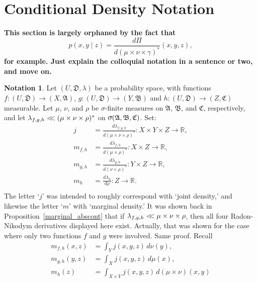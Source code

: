 \documentclass[
twoside=true,
paper=letter,
fontsize=9pt,
pagesize=auto,
leqno,
openany,
headsepline,
overfullrule,
]{scrbook}
\theoremstyle{plain}
\theoremstyle{plain}
\theoremstyle{definition}
\newtheorem{notn}[thm]{Notation}
\theoremstyle{bfnoteitalic}
\theoremstyle{bfnoteroman}
\newcommand{\sigalg}[1]{\mathfrak{#1}}
\newcommand{\textsigma}{\hbox{\large{$\sigma$}}\kern-1pt}
\newcommand{\R}{\mathbb{R}}
\newcommand{\sigmaalgebra}{\sigalg{A}}
\newcommand{\sigmaalgebraii}{\sigalg{B}}
\newcommand{\sigmaalgebraiii}{\sigalg{C}}
\newcommand{\funcf}{f}
\newcommand{\funcg}{g}
\newcommand{\funch}{h}
\newcommand{\funcj}{j}
\newcommand{\function}{f}
\newcommand{\functionii}{g}
\newcommand{\functioniii}{h}
\newcommand{\measurespace}{X}
\newcommand{\measurespaceii}{Y}
\newcommand{\measurespaceiii}{Z}
\newcommand{\mspaceelt}{x}
\newcommand{\mspaceeltii}{y}
\newcommand{\mspaceeltiii}{z}
\newcommand{\abscont}{\mathrel{< \kern-3.5pt <}}
\newcommand{\measure}{\mu}
\newcommand{\measmu}{\mu}
\newcommand{\measureii}{\nu}
\newcommand{\measnu}{\nu}
\newcommand{\measureiii}{\lambda}
\newcommand{\measureiv}{\rho}
\newcommand{\measrho}{\rho}
\newcommand{\uspace}{U}%
\newcommand{\uspacesig}{\sigalg{D}}
\newcommand{\marginalthree}{\gamma}
\begin{document}
\section{Conditional Density Notation}
\textbf{This section is largely orphaned by the fact that
\[
p(x,y\mid z)
=
\dfrac{d \Pi}{d(\measmu\times\measnu\times\marginalthree)^*}(x,y,z),
\]
for example. Just explain the colloquial notation in a sentence or two, and move on.}
\begin{notn}\label{densities}
Let
$(\uspace, \uspacesig, \measureiii)$
be a probability space, with functions
$\funcf:(\uspace,\uspacesig)\to (\measurespace,\sigmaalgebra)$,
$\funcg:(\uspace,\uspacesig)\to (\measurespaceii,\sigmaalgebraii)$
and
$\funch:(\uspace,\uspacesig)\to (\measurespaceiii,\sigmaalgebraiii)$
measurable.
Let $\measmu$, $\measnu$, and $\measrho$ be \textsigma\hyp{}finite measures on
$\sigmaalgebra$, $\sigmaalgebraii$, and $\sigmaalgebraiii$, respectively, and let
$\measureiii_{\function,\functionii,\functioniii} \abscont
(\measure\times\measureii\times\measureiv)^*$ on
$\textsigma(\sigmaalgebra,\sigmaalgebraii,\sigmaalgebraiii)$.
Set:
\begin{align*}
j
& =
\frac{d \measureiii_{\function,\functionii,\functioniii}}
{d(\measure\times\measureii\times\measureiv)^*}
:
\measurespace\times\measurespaceii\times\measurespaceiii\to\R,
\\
m_{\function,\functioniii}
& =
\frac{d \measureiii_{\function,\functioniii}}
{d(\measure\times\measureiv)^*}:\measurespace\times\measurespaceiii\to\R,
\\
m_{\functionii,\functioniii}
& =
\frac{d \measureiii_{\functionii,\functioniii}}
{d(\measureii\times\measureiv)^*}:\measurespaceii\times\measurespaceiii\to\R,
\\
m_\functioniii
& =
\frac{d \measureiii_\functioniii}
{d \measureiv}:\measurespaceiii\to\R.
\\
\end{align*}
The letter `$j$' was intended to roughly correspond with `joint density,' and likewise the letter
`$m$' with `marginal density.'
It was shown back in Proposition~\ref{marginal_abscont} that if
$\measureiii_{\function,\functionii,\functioniii} \abscont
\measure\times\measureii\times\measureiv$,
then all four Radon-Nikodym derivatives displayed here exist. Actually, that was shown for the case where only two functions $\function$ and $\functionii$ were involved. Same proof.
Recall
\begin{align*}
m_{\function,\functioniii} (\mspaceelt,\mspaceeltiii)
& =
\int_\measurespaceii
\funcj(\mspaceelt,\mspaceeltii,\mspaceeltiii)\,
d \measnu(\mspaceeltii),
\\
m_{\functionii,\functioniii} (\mspaceeltii,\mspaceeltiii)
& =
\int_\measurespace
\funcj(\mspaceelt,\mspaceeltii,\mspaceeltiii)\,
d \measmu(\mspaceelt),
\\
m_\funch(\mspaceeltiii)
& =
\int_{\measurespace\times\measurespaceii}
\funcj(\mspaceelt,\mspaceeltii,\mspaceeltiii)\,
d(\measmu\times\measnu)(\mspaceelt,\mspaceeltii)
\\
\end{align*}


\end{notn}
\end{document}
